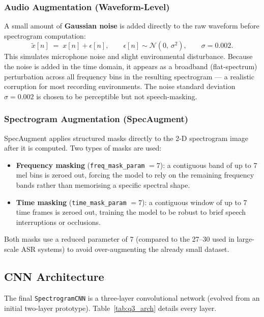 \documentclass[12pt, a4paper]{article}
\begin{document}
\subsubsection{Audio Augmentation (Waveform-Level)}

A small amount of \textbf{Gaussian noise} is added directly to the raw waveform before
spectrogram computation:
\[
    \tilde{x}[n] \;=\; x[n] + \epsilon[n], \qquad
    \epsilon[n] \sim \mathcal{N}(0,\,\sigma^{2}), \qquad
    \sigma = 0.002.
\]
This simulates microphone noise and slight environmental disturbance. Because the
noise is added in the time domain, it appears as a broadband (flat-spectrum) perturbation
across all frequency bins in the resulting spectrogram --- a realistic corruption for
most recording environments. The noise standard deviation $\sigma = 0.002$ is chosen
to be perceptible but not speech-masking.

\subsubsection{Spectrogram Augmentation (SpecAugment)}

SpecAugment applies structured masks directly to the 2-D spectrogram image after it is
computed. Two types of masks are used:
\begin{itemize}
    \item \textbf{Frequency masking} (\texttt{freq\_mask\_param} $= 7$): a contiguous
          band of up to 7 mel bins is zeroed out, forcing the model to rely on the
          remaining frequency bands rather than memorising a specific spectral shape.
    \item \textbf{Time masking} (\texttt{time\_mask\_param} $= 7$): a contiguous window
          of up to 7 time frames is zeroed out, training the model to be robust to brief
          speech interruptions or occlusions.
\end{itemize}

Both masks use a reduced parameter of 7 (compared to the 27--30 used in large-scale
ASR systems) to avoid over-augmenting the already small dataset.

\subsection{CNN Architecture}

The final \texttt{SpectrogramCNN} is a three-layer convolutional network (evolved from
an initial two-layer prototype). Table~\ref{tab:q3_arch} details every layer.
\end{document}
